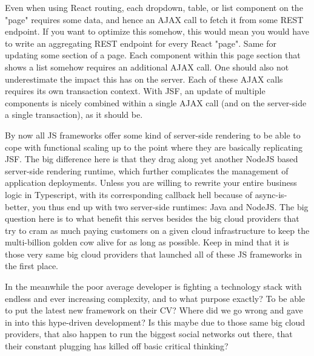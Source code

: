Even when using React routing, each dropdown, table, or list component on the "page" requires some data, and hence an AJAX call to fetch it from some REST endpoint.
If you want to optimize this somehow, this would mean you would have to write an aggregating REST endpoint for every React "page".
Same for updating some section of a page.
Each component within this page section that shows a list somehow requires an additional AJAX call.
One should also not underestimate the impact this has on the server.
Each of these AJAX calls requires its own transaction context.
With JSF, an update of multiple components is nicely combined within a single AJAX call (and on the server-side a single transaction), as it should be.

By now all JS frameworks offer some kind of server-side rendering to be able to cope with functional scaling up to the point where they are basically replicating JSF.
The big difference here is that they drag along yet another NodeJS based server-side rendering runtime, which further complicates the management of application deployments.
Unless you are willing to rewrite your entire business logic in Typescript, with its corresponding callback hell because of async-is-better, you thus end up with two server-side runtimes: Java and NodeJS.
The big question here is to what benefit this serves besides the big cloud providers that try to cram as much paying customers on a given cloud infrastructure to keep the multi-billion golden cow alive for as long as possible.
Keep in mind that it is those very same big cloud providers that launched all of these JS frameworks in the first place.

In the meanwhile the poor average developer is fighting a technology stack with endless and ever increasing complexity, and to what purpose exactly?
To be able to put the latest new framework on their CV?
Where did we go wrong and gave in into this hype-driven development?
Is this maybe due to those same big cloud providers, that also happen to run the biggest social networks out there, that their constant plugging has killed off basic critical thinking?

